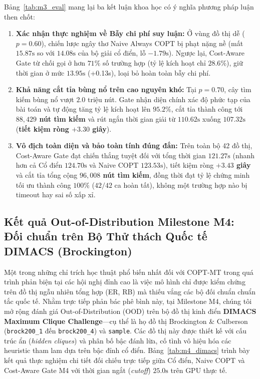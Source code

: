 \documentclass[11pt,a4paper]{article}
\begin{document}
Bảng~\ref{tab:m3_eval} mang lại ba kết luận khoa học có ý nghĩa phương pháp luận then chốt:
\begin{enumerate}[leftmargin=*]
    \item \textbf{Xác nhận thực nghiệm về Bẫy chi phí suy luận:} Ở vùng đồ thị dễ ($p = 0.60$), chiến lược ngây thơ Naive Always COPT bị phạt nặng nề (mất $15.87\text{s}$ so với $14.08\text{s}$ của bộ giải cổ điển, lỗ $-1.79\text{s}$). Ngược lại, Cost-Aware Gate từ chối gọi ở hơn $71\%$ số trường hợp (tỷ lệ kích hoạt chỉ $28.6\%$), giữ thời gian ở mức $13.95\text{s}$ (+0.13s), loại bỏ hoàn toàn bẫy chi phí.
    \item \textbf{Khả năng cắt tỉa bùng nổ trên cao nguyên khó:} Tại $p = 0.70$, cây tìm kiếm bùng nổ vượt $2.0$ triệu nút. Gate nhận diện chính xác độ phức tạp của bài toán và tự động tăng tỷ lệ kích hoạt lên $95.2\%$, cắt tỉa thành công tới \textbf{$88,429$ nút tìm kiếm} và rút ngắn thời gian giải từ $110.62\text{s}$ xuống $107.32\text{s}$ (\textbf{tiết kiệm ròng $+3.30$ giây}).
    \item \textbf{Vô địch toàn diện và bảo toàn tính đúng đắn:} Trên toàn bộ 42 đồ thị, Cost-Aware Gate đạt chiến thắng tuyệt đối với tổng thời gian $121.27\text{s}$ (nhanh hơn cả Cổ điển $124.70\text{s}$ và Naive COPT $123.53\text{s}$), tiết kiệm ròng \textbf{$+3.43$ giây} và cắt tỉa tổng cộng \textbf{$96,008$ nút tìm kiếm}, đồng thời đạt tỷ lệ chứng minh tối ưu thành công $100\%$ ($42/42$ ca hoàn tất), không một trường hợp nào bị timeout hay sai số xấp xỉ.
\end{enumerate}

\subsection{Kết quả Out-of-Distribution Milestone M4: Đối chuẩn trên Bộ Thử thách Quốc tế DIMACS (Brockington)}
Một trong những chỉ trích học thuật phổ biến nhất đối với COPT-MT trong quá trình phản biện tại các hội nghị đỉnh cao là việc mô hình chỉ được kiểm chứng trên đồ thị ngẫu nhiên tổng hợp (ER, RB) mà thiếu vắng các bộ đối chuẩn chuẩn tắc quốc tế. Nhằm trực tiếp phản bác phê bình này, tại Milestone M4, chúng tôi mở rộng đánh giá Out-of-Distribution (OOD) trên bộ đồ thị kinh điển \textbf{DIMACS Maximum Clique Challenge}---cụ thể là họ đồ thị Brockington \& Culberson (\texttt{brock200\_1} đến \texttt{brock200\_4}) và \texttt{sample}. Các đồ thị này được thiết kế với cấu trúc ẩn (\textit{hidden cliques}) và phân bố bậc đánh lừa, cố tình vô hiệu hóa các heuristic tham lam dựa trên bậc đỉnh cổ điển. Bảng~\ref{tab:m4_dimacs} trình bày kết quả thực nghiệm chi tiết đối chiếu trực tiếp giữa Cổ điển, Naive COPT và Cost-Aware Gate M4 với thời gian ngắt (\textit{cutoff}) $25.0\text{s}$ trên GPU thực tế.
\end{document}
